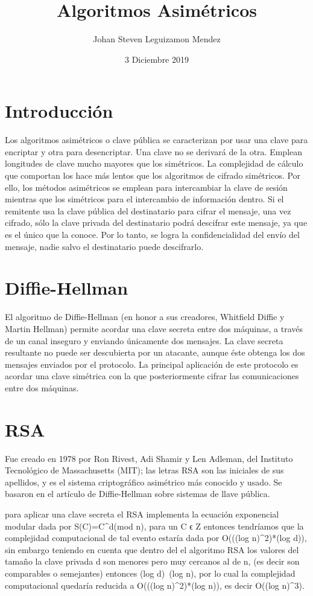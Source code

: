 \documentclass{article}
\title{Algoritmos Asimétricos}
\author{Johan Steven Leguizamon Mendez}
\date{3 Diciembre 2019}
\begin{document}
\maketitle

\section{Introducción}
Los algoritmos asimétricos o clave pública se caracterizan por usar una clave para encriptar y otra para desencriptar. Una clave no se derivará de la otra. Emplean longitudes de clave mucho mayores que los simétricos. La complejidad de cálculo que comportan los hace más lentos que los algoritmos de cifrado simétricos. Por ello, los métodos asimétricos se emplean para intercambiar la clave de sesión mientras que los simétricos para el intercambio de información dentro.
Si el remitente usa la clave pública del destinatario para cifrar el mensaje, una vez cifrado, sólo la clave privada del destinatario podrá descifrar este mensaje, ya que es el único que la conoce. Por lo tanto, se logra la confidencialidad del envío del mensaje, nadie salvo el destinatario puede descifrarlo.




\section{Diffie-Hellman}
El algoritmo de Diffie-Hellman (en honor a sus creadores, Whitfield Diffie y Martin Hellman) permite acordar una clave secreta entre dos máquinas, a través de un canal inseguro y enviando únicamente dos mensajes. La clave secreta resultante no puede ser descubierta por un atacante, aunque éste obtenga los dos mensajes enviados por el protocolo. La principal aplicación de este protocolo es acordar una clave simétrica con la que posteriormente cifrar las comunicaciones entre dos máquinas.
\section{RSA}
Fue creado en 1978 por Ron Rivest, Adi Shamir y Len Adleman, del Instituto Tecnológico de Massachusetts (MIT); las letras RSA son las iniciales de sus apellidos, y es el sistema criptográfico asimétrico más conocido y usado. Se basaron en el artículo de Diffie-Hellman sobre sistemas de llave pública.

para aplicar una clave secreta el RSA implementa la ecuación exponencial modular dada por S(C)=C^d(mod n), para un C ϵ Z  entonces tendríamos que la complejidad computacional de tal evento estaría dada por O(((log n)^2)*(log d)), sin embargo teniendo en cuenta que dentro del el algoritmo RSA los valores del tamaño la clave privada d son menores pero muy cercanos al de n, (es decir son comparables o semejantes) entonces (log d)~(log n), por lo cual la complejidad computacional quedaría reducida a O(((log n)^2)*(log n)), es decir O((log n)^3).
\end{document}
